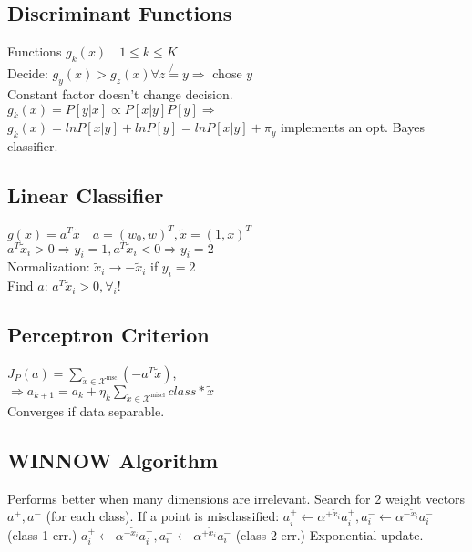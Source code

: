  \subsection*{Discriminant Functions}
 Functions $g_k(x)\quad1\leq k\leq K$\\
 Decide: $g_y(x){>}g_z(x)\forall z \not{=} y {\Rightarrow}$ chose $y$\\
 Constant factor doesn't change decision.\\
 $g_k(x)=P[y|x]\propto P[x|y]P[y] \Rightarrow$\\
 $g_k(x){=}lnP[x|y]+lnP[y]{=}lnP[x|y]+\pi_y$
 implements an opt. Bayes classifier.


\subsection*{Linear Classifier}
$g(x)=a^T\tilde{x}\quad a=(w_0,w)^T, \tilde{x}=(1,x)^T$\\
$a^T\tilde{x}_i>0 \Rightarrow y_i=1, a^T\tilde{x}_i<0 \Rightarrow y_i=2$\\
Normalization: $\tilde{x}_i\rightarrow-\tilde{x}_i$ if $y_i=2$ \\
Find $a$: $a^T\tilde{x}_i>0,\forall_i$!
\subsection*{Perceptron Criterion}
$J_P(a)=\sum_{\tilde{x}\in\mathcal{X}^\text{msc}}(-a^T\tilde{x})$,\\
$\Rightarrow a_{k+1}=a_k+\eta_k \sum_{\tilde{x}\in\mathcal{X}^\text{miscl}} class* \tilde{x}$\\
Converges if data separable.
\subsection*{WINNOW Algorithm}
Performs better when many dimensions are irrelevant. Search for 2 weight vectors $a^+, a^-$ (for each class). If a point is misclassified:
$a_i^+ {\leftarrow} \alpha^{+\tilde{x}_i}a_i^+, a_i^- {\leftarrow} \alpha^{-\tilde{x}_i}a_i^-$ (class 1 err.)
$a_i^+ {\leftarrow} \alpha^{-\tilde{x}_i}a_i^+, a_i^- {\leftarrow} \alpha^{+\tilde{x}_i}a_i^-$ (class 2 err.)
Exponential update.


